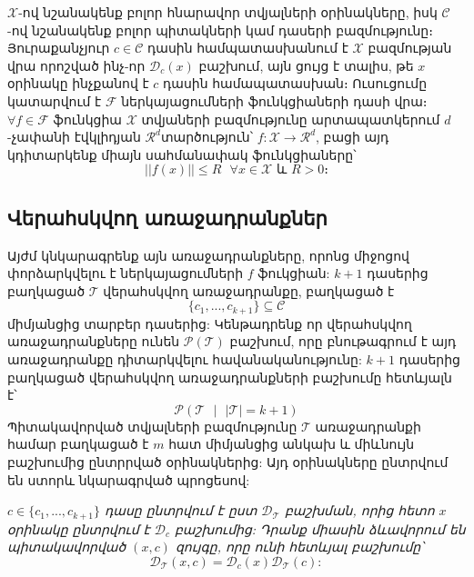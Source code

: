 \documentclass[11pt]{article}
\begin{document}
 $\mathcal{X}$-ով նշանակենք բոլոր հնարավոր տվյալների օրինակները, իսկ $\mathcal{C}$-ով նշանակենք բոլոր պիտակների կամ դասերի բազմությունը։ Յուրաքանչյուր $c \in \mathcal{C}$ դասին համպատասխանում է $\mathcal{X}$ բազմության վրա որոշված ինչ-որ $\mathcal{D}_c(x)$ բաշխում, այն ցույց է տալիս, թե $x$ օրինակը ինչքանով է $c$ դասին համապատասխան։ Ուսուցումը կատարվում է $\mathcal{F}$ ներկայացումների ֆունկցիաների դասի վրա։ $\forall f \in \mathcal{F}$  ֆունկցիա $\mathcal{X}$ տվյաների բազմությունը արտապատկերում $d$-չափանի էվկլիդյան $\mathcal{R}^d$տարծություն՝ $f:\mathcal{X}\rightarrow\mathcal{R}^d$, բացի այդ կդիտարկենք միայն սահմանափակ ֆունկցիաները՝
 $$||f(x)|| \leq R \text{    } \forall x \in \mathcal{X} \text{ և } R > 0։$$ 



\subsection*{Վերահսկվող առաջադրանքներ}

\par Այժմ կնկարագրենք այն առաջադրանքները, որոնց միջոցով փորձարկվելու է ներկայացումների $f$ ֆուկցիան: $k+1$ դասերից բաղկացած $\mathcal{T}$ վերահսկվող առաջադրանքը, բաղկացած է $$\{c_1, ..., c_{k+1}\} \subseteq \mathcal{C}$$
միմյանցից տարբեր դասերից: Կենթադրենք որ վերահսկվող առաջադրանքները ունեն $\mathcal{P}(\mathcal{T})$ բաշխում, որը բնութագրում է այդ առաջադրանքը դիտարկվելու հավանականությունը: $k+1$ դասերից բաղկացած վերահսկվող առաջադրանքների բաշխումը հետևյալն է՝ $$\mathcal{P}(\mathcal{T} \text{ } |\text{ }  |\mathcal{T}| = k +1)$$ Պիտակավորված տվյալների բազմությունը $\mathcal{T}$ առաջադրանքի համար բաղկացած է $m$ հատ միմյանցից անկախ և միևնույն բաշխումից ընտրրված օրինակներից: Այդ օրինակները ընտրվում են ստորև նկարագրված պրոցեսով:

\textit{$c \in \{c_1, ..., c_{k+1}\} $   դասը ընտրվում է ըստ $\mathcal{D}_{\mathcal{T}}$ բաշխման, որից հետո $x$ օրինակը ընտրվում է $\mathcal{D}_c$ բաշխումից: Դրանք միասին ձևավորում են պիտակավորված $(x, c)$ զույգը, որը ունի հետևյալ բաշխումը՝
$$\mathcal{D}_{\mathcal{T}} (x, c) = \mathcal{D}_{c}(x)\mathcal{D}_{\mathcal{T}}(c):$$}
\end{document}
